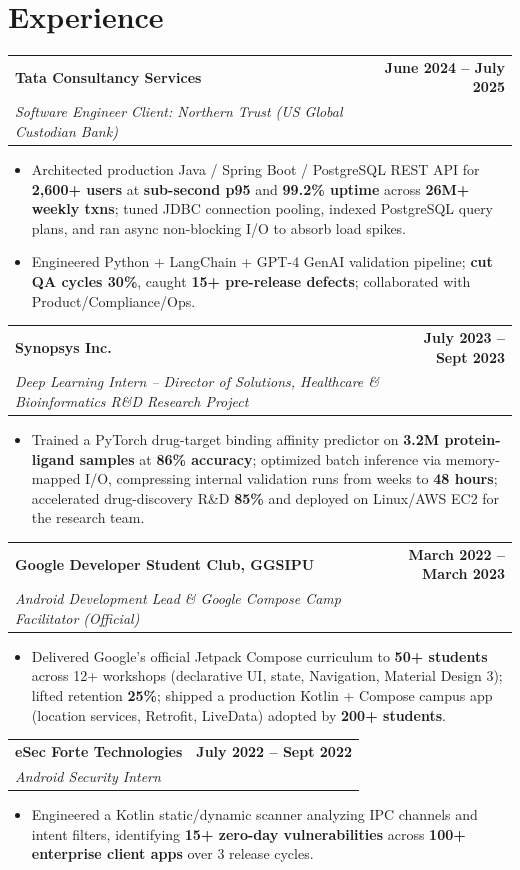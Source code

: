 \documentclass[10pt, letterpaper]{article}
\makeatletter
\newcommand{\resumeEntry}[3]{\vspace{2pt}\noindent\begin{tabular*}{\textwidth}{@{}l@{\extracolsep{\fill}}r@{}}\textbf{\large #1} & \textbf{#3} \\\textit{#2} & \\\end{tabular*}}
\makeatother
\begin{document}
\vspace{-4pt}
\section{Experience}

\resumeEntry{Tata Consultancy Services}{Software Engineer \textbar{} Client: Northern Trust (US Global Custodian Bank)}{June 2024 -- July 2025}
\begin{itemize}
    \item Architected production Java / Spring Boot / PostgreSQL REST API for \textbf{2,600+ users} at \textbf{sub-second p95} and \textbf{99.2\% uptime} across \textbf{26M+ weekly txns}; tuned JDBC connection pooling, indexed PostgreSQL query plans, and ran async non-blocking I/O to absorb load spikes.
    \item Engineered Python + LangChain + GPT-4 GenAI validation pipeline; \textbf{cut QA cycles 30\%}, caught \textbf{15+ pre-release defects}; collaborated with Product/Compliance/Ops.
\end{itemize}

\resumeEntry{Synopsys Inc.}{Deep Learning Intern -- Director of Solutions, Healthcare \& Bioinformatics \textbar{} R\&D Research Project}{July 2023 -- Sept 2023}
\begin{itemize}
    \item Trained a PyTorch drug-target binding affinity predictor on \textbf{3.2M protein-ligand samples} at \textbf{86\% accuracy}; optimized batch inference via memory-mapped I/O, compressing internal validation runs from weeks to \textbf{48 hours}; accelerated drug-discovery R\&D \textbf{85\%} and deployed on Linux/AWS EC2 for the research team.
\end{itemize}

\resumeEntry{Google Developer Student Club, GGSIPU}{Android Development Lead \& Google Compose Camp Facilitator (Official)}{March 2022 -- March 2023}
\begin{itemize}
    \item Delivered Google's official Jetpack Compose curriculum to \textbf{50+ students} across 12+ workshops (declarative UI, state, Navigation, Material Design 3); lifted retention \textbf{25\%}; shipped a production Kotlin + Compose campus app (location services, Retrofit, LiveData) adopted by \textbf{200+ students}.
\end{itemize}

\resumeEntry{eSec Forte Technologies}{Android Security Intern}{July 2022 -- Sept 2022}
\begin{itemize}
    \item Engineered a Kotlin static/dynamic scanner analyzing IPC channels and intent filters, identifying \textbf{15+ zero-day vulnerabilities} across \textbf{100+ enterprise client apps} over 3 release cycles.
\end{itemize}
\end{document}
